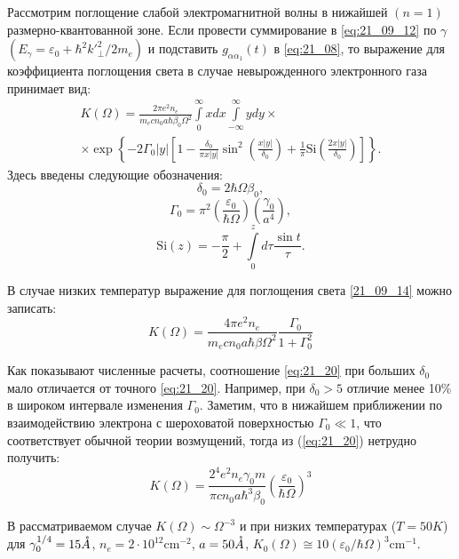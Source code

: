 Рассмотрим поглощение слабой электромагнитной волны в нижайшей $(n=1)$ размерно-квантованной зоне. Если провести суммирование в \eqref{eq:21_09_12} по $\gamma$ $\left( E_{\gamma} = \varepsilon_0 + \hbar^2 {k'}_{\bot}^2 / {2m_e} \right) $ и подставить $g_{\alpha\alpha_1 }(t)$ в \eqref{eq:21_08}, то выражение для коэффициента поглощения света в случае невырожденного электронного газа принимает вид:
\begin{multline} \label{21_09_14}
K(\Omega) = \frac{2 \pi e^2 n_e }{m_e c n_0 a \hbar \beta_0 \Omega^2} \int\limits_0^{\infty}x dx \int\limits_{-\infty}^{\infty}y dy \times \\
\times \exp{\left\lbrace  - 2\Gamma_0 |y| \left[ 1 - \frac{\delta_0}{\pi x |y|}\sin^2{\left( \frac{x|y|}{\delta_0}\right) } + \frac{1}{\pi} \mathrm{Si}{\left( \frac{2x|y|}{\delta_0}\right) } \right]  \right\rbrace   }.
\end{multline} 
Здесь введены следующие обозначения:
\[
\delta_0 = 2\hbar \Omega \beta_0,
\]
\[
\Gamma_0 = \pi^2 \left(\frac{\varepsilon_0}{\hbar \Omega} \right) \left( \frac{\gamma_0}{a^4} \right),
\]
\[
\mathrm{Si}(z) = -\frac{\pi}{2} + \int\limits_0^z{d\tau\frac{\sin{t}}{\tau}}.
\]

В случае низких температур выражение для поглощения света \eqref{21_09_14} можно записать:
\begin{equation} \label{eq:21_20}
K(\Omega )=\frac{4\pi e^{2} n_{e} }{m_e c n_0 a \hbar\beta \Omega^2 } \frac{\Gamma_0 }{1+\Gamma_0^2 }
\end{equation} 

Как показывают численные расчеты, соотношение \ref{eq:21_20} при больших $\delta_0$ мало отличается от точного \ref{eq:21_20}. Например, при $\delta_0 > 5$ отличие менее 10\% в широком интервале изменения $\Gamma_0$. Заметим, что в нижайшем приближении по взаимодействию электрона с шероховатой поверхностью $\Gamma_0 \ll 1$, что соответствует обычной теории возмущений, тогда из (\ref{eq:21_20}) нетрудно получить:
\begin{equation} \label{eq:21_30}
K(\Omega )=\frac{2^4 e^2 n_e \gamma_0 m}{\pi c n_0 a\hbar^3 \beta_0 } \left(\frac{\varepsilon_0 }{\hbar\Omega } \right)^3
\end{equation} 

В рассматриваемом случае $K(\Omega )\sim \Omega^{-3} $ и при низких температурах ($T=50 K$) для $\gamma_0^{1/4} =15 \AA$, $n_e = 2\cdot 10^{12} \text{cm}^{-2} $, $a=50 \AA$, $K_0 (\Omega )\cong 10\left(\varepsilon_0 / \hbar\Omega \right)^3 \text{cm}^{-1} $.

